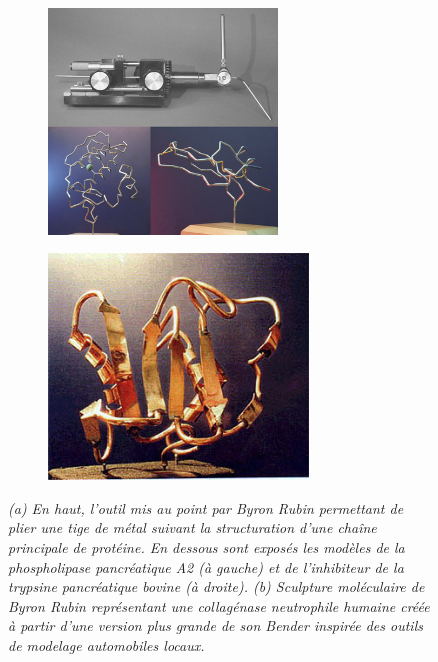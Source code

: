 \begin{figure}
  \begin{subfigure}{.5\textwidth}
  \centering
  {\includegraphics[height=6cm]{./figures/ch1/bender_tool_models}}
    \label{Fig:bender_tool_models}
  \caption{}
  \end{subfigure}%
  \begin{subfigure}{.5\textwidth}
  \centering
  {\includegraphics[height=6cm]{./figures/ch1/byron_sculpture_colagenase}}    
    \label{Fig:byron_rubin_art}
  \caption{}
  \end{subfigure}%
 \caption[(a) \textit{Byron's Bender} et plusieurs représentations physiques de protéines créées avec l'outil. (b) Sculpture moléculaire d'une collagénase de Byron Rubin.]{\it (a) En haut, l'outil mis au point par Byron Rubin permettant de plier une tige de métal suivant la structuration d'une chaîne principale de protéine. En dessous sont exposés les modèles de la phospholipase pancréatique A2 (à gauche) et de l'inhibiteur de la trypsine pancréatique bovine (à droite).
  (b) Sculpture moléculaire de Byron Rubin représentant une collagénase neutrophile humaine créée à partir d'une version plus grande de son Bender inspirée des outils de modelage automobiles locaux.}
\end{figure}


